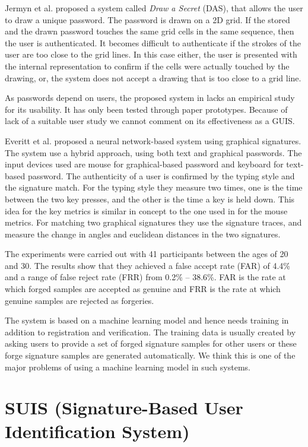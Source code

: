 \documentclass[conference]{IEEEtran}
\begin{document}
Jermyn et al. \cite{DAS} proposed a system called \emph{Draw a Secret} (DAS), that allows the user to draw a unique password. The password is drawn on a 2D grid. If the stored and the drawn password touches the same grid cells in the same sequence, then the user is authenticated. It becomes difficult to authenticate if the strokes of the user are too close to the grid lines. In this case either, the user is presented with the internal representation to confirm if the cells were actually touched by the drawing, or, the system does not accept a drawing that is too close to a grid line.

As passwords depend on users, the proposed system in \cite{DAS} lacks an empirical study for its usability. It has only been tested through paper prototypes. Because of lack of a suitable user study we cannot comment on its effectiveness as a GUIS.

Everitt et al. \cite{java-gp} proposed a neural network-based system using graphical signatures. The system use a hybrid approach, using both text and graphical passwords. The input devices used are mouse for graphical-based password and keyboard for text-based password. The authenticity of a user is confirmed by the typing style and the signature match. For the typing style they measure two times, one is the time between the two key presses, and the other is the time a key is held down. This idea for the key metrics is similar in concept to the one used in \cite{signature-gp} for the mouse metrics. For matching two graphical signatures they use the signature traces, and measure the change in angles and euclidean distances in the two signatures.

The experiments were carried out with 41 participants between the ages of 20 and 30. The results show that they achieved a false accept rate (FAR) of 4.4\% and a range of false reject rate (FRR) from 0.2\% -- 38.6\%. FAR is the rate at which forged samples are accepted as genuine and FRR is the rate at which genuine samples are rejected as forgeries.

The system \cite{java-gp} is based on a machine learning model and hence needs training in addition to registration and verification. The training data is usually created by asking users to provide a set of forged signature samples for other users or these forge signature samples are generated automatically. We think this is one of the major problems of using a machine learning model in such systems.


\section{SUIS (Signature-Based User Identification System)}\label{sec:suis}
\end{document}
